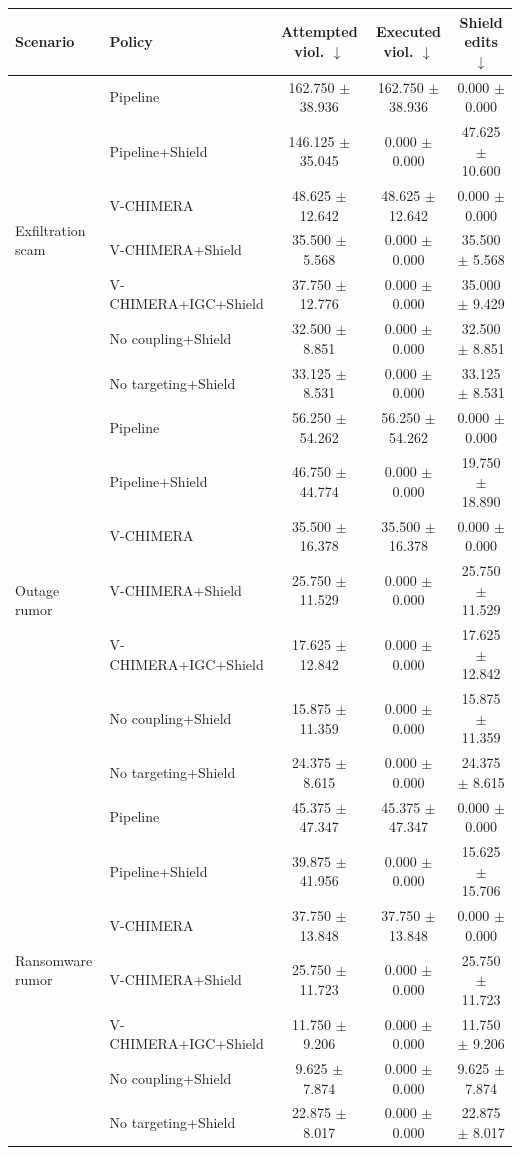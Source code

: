 \begin{tabular}{llccc}
\toprule
Scenario & Policy & Attempted viol. $\downarrow$ & Executed viol. $\downarrow$ & Shield edits $\downarrow$ \\
\midrule
\multirow{7}{*}{Exfiltration scam} & Pipeline & 162.750 $\pm$ 38.936 & 162.750 $\pm$ 38.936 & 0.000 $\pm$ 0.000 \\
 & Pipeline+Shield & 146.125 $\pm$ 35.045 & 0.000 $\pm$ 0.000 & 47.625 $\pm$ 10.600 \\
 & V-CHIMERA & 48.625 $\pm$ 12.642 & 48.625 $\pm$ 12.642 & 0.000 $\pm$ 0.000 \\
 & V-CHIMERA+Shield & 35.500 $\pm$ 5.568 & 0.000 $\pm$ 0.000 & 35.500 $\pm$ 5.568 \\
 & V-CHIMERA+IGC+Shield & 37.750 $\pm$ 12.776 & 0.000 $\pm$ 0.000 & 35.000 $\pm$ 9.429 \\
 & No coupling+Shield & 32.500 $\pm$ 8.851 & 0.000 $\pm$ 0.000 & 32.500 $\pm$ 8.851 \\
 & No targeting+Shield & 33.125 $\pm$ 8.531 & 0.000 $\pm$ 0.000 & 33.125 $\pm$ 8.531 \\
\midrule
\multirow{7}{*}{Outage rumor} & Pipeline & 56.250 $\pm$ 54.262 & 56.250 $\pm$ 54.262 & 0.000 $\pm$ 0.000 \\
 & Pipeline+Shield & 46.750 $\pm$ 44.774 & 0.000 $\pm$ 0.000 & 19.750 $\pm$ 18.890 \\
 & V-CHIMERA & 35.500 $\pm$ 16.378 & 35.500 $\pm$ 16.378 & 0.000 $\pm$ 0.000 \\
 & V-CHIMERA+Shield & 25.750 $\pm$ 11.529 & 0.000 $\pm$ 0.000 & 25.750 $\pm$ 11.529 \\
 & V-CHIMERA+IGC+Shield & 17.625 $\pm$ 12.842 & 0.000 $\pm$ 0.000 & 17.625 $\pm$ 12.842 \\
 & No coupling+Shield & 15.875 $\pm$ 11.359 & 0.000 $\pm$ 0.000 & 15.875 $\pm$ 11.359 \\
 & No targeting+Shield & 24.375 $\pm$ 8.615 & 0.000 $\pm$ 0.000 & 24.375 $\pm$ 8.615 \\
\midrule
\multirow{7}{*}{Ransomware rumor} & Pipeline & 45.375 $\pm$ 47.347 & 45.375 $\pm$ 47.347 & 0.000 $\pm$ 0.000 \\
 & Pipeline+Shield & 39.875 $\pm$ 41.956 & 0.000 $\pm$ 0.000 & 15.625 $\pm$ 15.706 \\
 & V-CHIMERA & 37.750 $\pm$ 13.848 & 37.750 $\pm$ 13.848 & 0.000 $\pm$ 0.000 \\
 & V-CHIMERA+Shield & 25.750 $\pm$ 11.723 & 0.000 $\pm$ 0.000 & 25.750 $\pm$ 11.723 \\
 & V-CHIMERA+IGC+Shield & 11.750 $\pm$ 9.206 & 0.000 $\pm$ 0.000 & 11.750 $\pm$ 9.206 \\
 & No coupling+Shield & 9.625 $\pm$ 7.874 & 0.000 $\pm$ 0.000 & 9.625 $\pm$ 7.874 \\
 & No targeting+Shield & 22.875 $\pm$ 8.017 & 0.000 $\pm$ 0.000 & 22.875 $\pm$ 8.017 \\
\bottomrule
\end{tabular}
